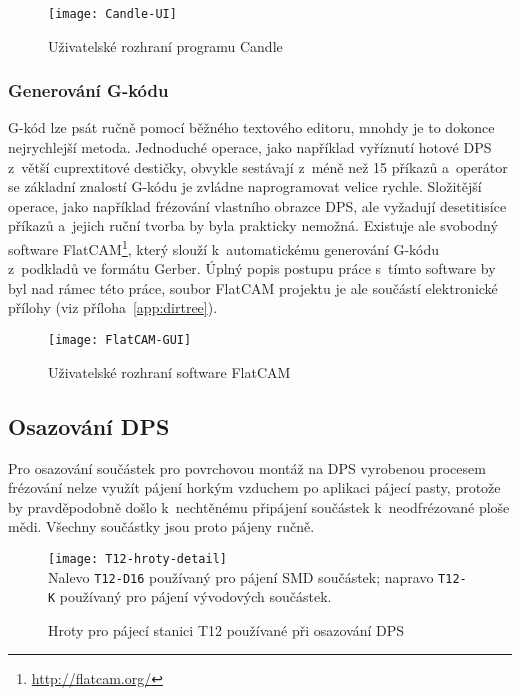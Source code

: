 \begin{figure}[htbp]
    \centering
    \texttt{[image: Candle-UI]}
    \caption{Uživatelské rozhraní programu Candle}
    \label{fig:CNC Candle}
\end{figure}


\subsubsection{Generování G-kódu}
G-kód lze psát ručně pomocí běžného textového editoru, mnohdy je to dokonce
nejrychlejší metoda. Jednoduché operace, jako například vyříznutí hotové DPS
z~větší cuprextitové destičky, obvykle sestávají z~méně než 15 příkazů
a~operátor se základní znalostí G-kódu je zvládne naprogramovat velice rychle.
Složitější operace, jako například frézování vlastního obrazce DPS, ale
vyžadují desetitisíce příkazů a~jejich ruční tvorba by byla prakticky nemožná.
Existuje ale svobodný software FlatCAM\footnote{\url{http://flatcam.org/}},
který slouží k~automatickému generování G-kódu z~podkladů ve formátu Gerber.
Úplný popis postupu práce s~tímto software by byl nad rámec této práce, soubor
FlatCAM projektu je ale součástí elektronické přílohy (viz
příloha~\vref{app:dirtree}).

\begin{figure}[htbp]
    \centering
    \texttt{[image: FlatCAM-GUI]}
    \caption{Uživatelské rozhraní software FlatCAM}
    \label{fig:CNC FlatCAM}
\end{figure}


\subsection{Osazování DPS}
Pro osazování součástek pro povrchovou montáž na DPS vyrobenou procesem
frézování nelze využít pájení horkým vzduchem po aplikaci pájecí pasty, protože
by pravděpodobně došlo k~nechtěnému připájení součástek k~neodfrézované ploše
mědi. Všechny součástky jsou proto pájeny ručně.

\begin{figure}[htb]
    \centering
    \texttt{[image: T12-hroty-detail]}
    \\
    {\footnotesize Nalevo \texttt{T12-D16} používaný pro pájení SMD součástek;
    napravo \texttt{T12-K} používaný pro pájení vývodových součástek.}
    \caption{Hroty pro pájecí stanici T12 používané při osazování DPS}
    \label{fig:PCB pajecka hroty}
\end{figure}

